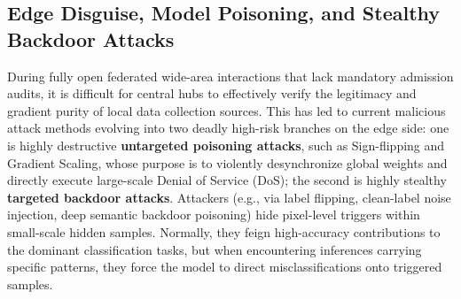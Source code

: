 \documentclass[runningheads]{llncs}
\begin{document}
\subsection{Edge Disguise, Model Poisoning, and Stealthy Backdoor Attacks}
During fully open federated wide-area interactions that lack mandatory admission audits, it is difficult for central hubs to effectively verify the legitimacy and gradient purity of local data collection sources. This has led to current malicious attack methods evolving into two deadly high-risk branches on the edge side: one is highly destructive \textbf{untargeted poisoning attacks}, such as Sign-flipping and Gradient Scaling, whose purpose is to violently desynchronize global weights and directly execute large-scale Denial of Service (DoS); the second is highly stealthy \textbf{targeted backdoor attacks}. Attackers (e.g., via label flipping, clean-label noise injection, deep semantic backdoor poisoning) hide pixel-level triggers within small-scale hidden samples. Normally, they feign high-accuracy contributions to the dominant classification tasks, but when encountering inferences carrying specific patterns, they force the model to direct misclassifications onto triggered samples.
\end{document}
